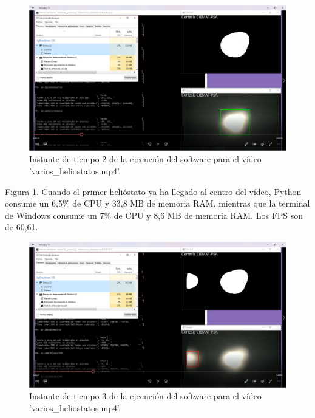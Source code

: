 \begin{figure}[h!]
  	\centering
	\includegraphics[width=\textwidth]{CapturasRendimientoSoftware1/Imagen2.png}
	\caption{Instante de tiempo 2 de la ejecución del software para el vídeo 'varios\_heliostatos.mp4'.
	\label{fig:CapturasRendimientoSoftware1/Imagen2.png}}
\end{figure}

Figura \ref{fig:CapturasRendimientoSoftware1/Imagen2.png}. Cuando el primer helióstato ya ha llegado al centro del vídeo, Python consume un 6,5\% de CPU y 33,8 MB de memoria RAM, mientras que la terminal de Windows consume un 7\% de CPU y 8,6 MB de memoria RAM. Los FPS son de 60,61.\\[20pt]

\begin{figure}[h!]
  	\centering
	\includegraphics[width=\textwidth]{CapturasRendimientoSoftware1/Imagen3.png}
	\caption{Instante de tiempo 3 de la ejecución del software para el vídeo 'varios\_heliostatos.mp4'.
	\label{fig:CapturasRendimientoSoftware1/Imagen3.png}}
\end{figure}

